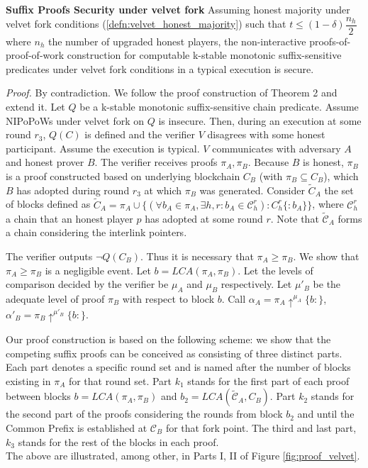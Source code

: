 \begin{thm}{\textbf{Suffix Proofs Security under velvet fork}}
	Assuming honest majority under velvet fork conditions (\ref{defn:velvet_honest_majority}) such that $t \leq (1 - \delta) \dfrac{n_h}{2}$ where $n_h$ the number of upgraded honest players, the non-interactive proofs-of-proof-of-work construction for computable k-stable monotonic suffix-sensitive predicates under velvet fork conditions in a typical execution is secure.
\end{thm}
\textit{Proof.} By contradiction. We follow the proof construction of Theorem 2
and extend it. Let $Q$ be a k-stable monotonic suffix-sensitive chain
predicate. Assume NIPoPoWs under velvet fork on $Q$ is insecure. Then, during
an execution at some round  $r_3$, $Q(C)$ is defined and the verifier $V$
disagrees with some honest participant. Assume the execution is typical. $V$
communicates with adversary $A$ and honest prover $B$. The verifier receives
proofs $\pi_A, \pi_B$. Because $B$ is honest, $\pi_B$ is a proof constructed
based on underlying blockchain $C_B$ (with $\pi_B \subseteq C_B$), which $B$
has adopted during round $r_3$ at which $\pi_B$ was generated. Consider $\widetilde{C}_A$ the set of blocks defined as $\widetilde{C}_A = \pi_A \cup \{ (\forall b_A \in \pi_A, \exists h,r : b_A \in \mathcal{C}_{h}^{r}): C_h^r\{:b_A\} \}$, where $\mathcal{C}_h^r$ a chain that an honest player $p$ has adopted at some round $r$. Note that $\widetilde{\mathcal{C}}_A$ forms a chain considering the interlink pointers.

The verifier outputs $\neg Q(C_B)$. Thus it is necessary that $\pi_A \geq \pi_B$.
We show that $\pi_A \geq \pi_B$ is a negligible event.
Let $b = LCA(\pi_A, \pi_B)$. Let the levels of comparison decided by the verifier
be $\mu_A$ and $\mu_B$ respectively. Let $\mu'_B$ be the adequate level of proof
$\pi_B$  with respect to block $b$. Call $\alpha_A = \pi_A \uparrow^{\mu_A}\{b:\}$,
$\alpha'_B = \pi_B \uparrow^{\mu'_B}\{b:\}$.

Our proof construction is based on the following scheme: we show that the competing
suffix proofs can be conceived as consisting of three distinct parts. Each part
denotes a specific round set and is named after the number of blocks existing
in $\pi_A$ for that round set. Part $k_1$ stands for the first part of each proof
between blocks $b = LCA(\pi_A, \pi_B)$ and $b_2 = LCA(\widetilde{\mathcal{C}}_A, C_B)$. Part $k_2$ stands for the second part
of the proofs considering the rounds from block $b_2$ and until
the Common Prefix is established at $\mathcal{C}_B$ for that fork point.
The third and last part, $k_3$ stands for the rest of the blocks in each proof.\\
The above are illustrated, among other, in Parts I, II of Figure \ref{fig:proof_velvet}.

